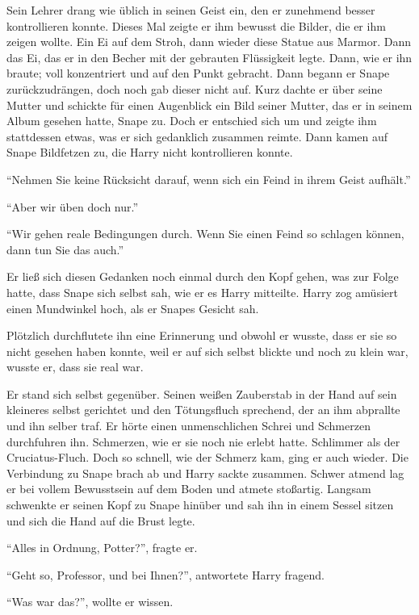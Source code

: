 \begin{rueckblick}
Sein Lehrer drang wie üblich in seinen Geist ein, den er zunehmend besser kontrollieren konnte. Dieses Mal zeigte er ihm bewusst die Bilder, die er ihm zeigen wollte. Ein Ei auf dem Stroh, dann wieder diese Statue aus Marmor. Dann das Ei, das er in den Becher mit der gebrauten Flüssigkeit legte. Dann, wie er ihn braute; voll konzentriert und auf den Punkt gebracht. Dann begann er Snape zurückzudrängen, doch noch gab dieser nicht auf. Kurz dachte er über seine Mutter und schickte für einen Augenblick ein Bild seiner Mutter, das er in seinem Album gesehen hatte, Snape zu. Doch er entschied sich um und zeigte ihm stattdessen etwas, was er sich gedanklich zusammen reimte. Dann kamen auf Snape Bildfetzen zu, die Harry nicht kontrollieren konnte.

\enquote{Nehmen Sie keine Rücksicht darauf, wenn sich ein Feind in ihrem Geist aufhält.}

\enquote{Aber wir üben doch nur.}

\enquote{Wir gehen reale Bedingungen durch. Wenn Sie einen Feind so schlagen können, dann tun Sie das auch.}

Er ließ sich diesen Gedanken noch einmal durch den Kopf gehen, was zur Folge hatte, dass Snape sich selbst sah, wie er es Harry mitteilte. Harry zog amüsiert einen Mundwinkel hoch, als er Snapes Gesicht sah.

Plötzlich durchflutete ihn eine Erinnerung und obwohl er wusste, dass er sie so nicht gesehen haben konnte, weil er auf sich selbst blickte und noch zu klein war, wusste er, dass sie real war.

Er stand sich selbst gegenüber. Seinen weißen Zauberstab in der Hand auf sein kleineres selbst gerichtet und den Tötungsfluch sprechend, der an ihm abprallte und ihn selber traf. Er hörte einen unmenschlichen Schrei und Schmerzen durchfuhren ihn. Schmerzen, wie er sie noch nie erlebt hatte. Schlimmer als der Cruciatus-Fluch. Doch so schnell, wie der Schmerz kam, ging er auch wieder. Die Verbindung zu Snape brach ab und Harry sackte zusammen. Schwer atmend lag er bei vollem Bewusstsein auf dem Boden und atmete stoßartig. Langsam schwenkte er seinen Kopf zu Snape hinüber und sah ihn in einem Sessel sitzen und sich die Hand auf die Brust legte.

\enquote{Alles in Ordnung, Potter?}, fragte er.

\enquote{Geht so, Professor, und bei Ihnen?}, antwortete Harry fragend.

\enquote{Was war das?}, wollte er wissen.


\end{rueckblick}

